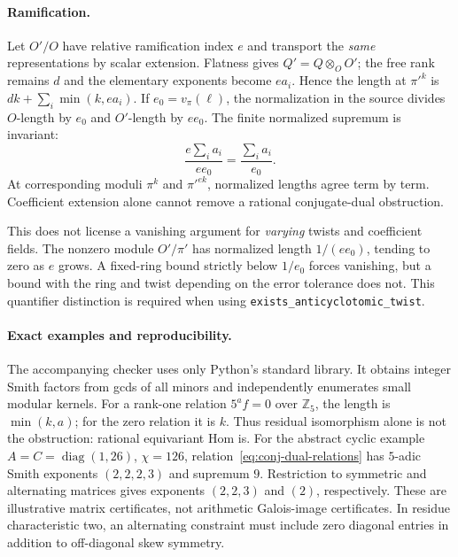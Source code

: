 \paragraph{Ramification.}
Let $O'/O$ have relative ramification index $e$ and transport the \emph{same}
representations by scalar extension. Flatness gives $Q'=Q\otimes_OO'$;
the free rank remains $d$ and the elementary exponents become $ea_i$.
Hence the length at $\pi'^k$ is $dk+\sum_i\min(k,ea_i)$.
If $e_0=v_\pi(\ell)$, the normalization in the source divides $O$-length by
$e_0$ and $O'$-length by $ee_0$. The finite normalized supremum is invariant:
\[
 \frac{e\sum_i a_i}{ee_0}=\frac{\sum_i a_i}{e_0}.
\]
At corresponding moduli $\pi^k$ and $\pi'^{ek}$, normalized lengths agree
term by term. Coefficient extension alone cannot remove a rational
conjugate-dual obstruction.

This does not license a vanishing argument for \emph{varying} twists and
coefficient fields. The nonzero module $O'/\pi'$ has normalized length
$1/(ee_0)$, tending to zero as $e$ grows. A fixed-ring bound strictly below
$1/e_0$ forces vanishing, but a bound with the ring and twist depending on
the error tolerance does not. This quantifier distinction is required when
using \texttt{exists\_anticyclotomic\_twist}.

\paragraph{Exact examples and reproducibility.}
The accompanying checker uses only Python's standard library. It obtains
integer Smith factors from gcds of all minors and independently enumerates
small modular kernels. For a rank-one relation $5^a f=0$ over $\mathbb Z_5$,
the length is $\min(k,a)$; for the zero relation it is $k$. Thus residual
isomorphism alone is not the obstruction: rational equivariant Hom is.
For the abstract cyclic example $A=C=\operatorname{diag}(1,26)$,
$\chi=126$, relation~\eqref{eq:conj-dual-relations} has $5$-adic Smith
exponents $(2,2,2,3)$ and supremum $9$. Restriction to symmetric and
alternating matrices gives exponents $(2,2,3)$ and $(2)$, respectively.
These are illustrative matrix certificates, not arithmetic Galois-image
certificates. In residue characteristic two, an alternating constraint must
include zero diagonal entries in addition to off-diagonal skew symmetry.
